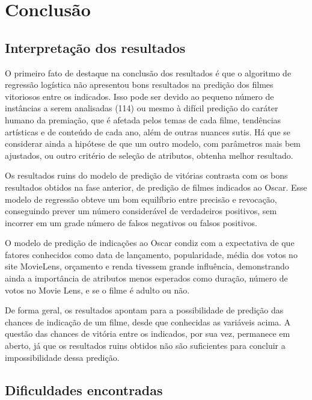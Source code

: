 \chapter[Conclusão]{Conclusão}
    \section{Interpretação dos resultados}\par
        O primeiro fato de destaque na conclusão dos resultados é que o algoritmo de regressão logística não apresentou bons resultados na predição dos filmes vitoriosos entre os indicados. Isso pode ser devido ao pequeno número de instâncias a serem analisadas (114) ou mesmo à difícil predição do caráter humano da premiação, que é afetada pelos temas de cada filme, tendências artísticas e de conteúdo de cada ano, além de outras nuances sutis. Há que se considerar ainda a hipótese de que um outro modelo, com parâmetros mais bem ajustados, ou outro critério de seleção de atributos, obtenha melhor resultado.
        
        Os resultados ruins do modelo de predição de vitórias contrasta com os bons resultados obtidos na fase anterior, de predição de filmes indicados ao Oscar. Esse modelo de regressão obteve um bom equilíbrio entre precisão e revocação, conseguindo prever um número considerável de verdadeiros positivos, sem incorrer em um grade número de falsos negativos ou falsos positivos.
        
        O modelo de predição de indicações ao Oscar condiz com a expectativa de que fatores conhecidos como data de lançamento, popularidade, média dos votos no site MovieLens, orçamento e renda tivessem grande influência, demonstrando ainda a importância de atributos menos esperados como duração, número de votos no Movie Lens, e se o filme é adulto ou não.
        
        De forma geral, os resultados apontam para a possibilidade de predição das chances de indicação de um filme, desde que conhecidas as variáveis acima. A questão das chances de vitória entre os indicados, por sua vez, permanece em aberto, já que os resultados ruins obtidos não são suficientes para concluir a impossibilidade dessa predição.

    \section[Dificuldades encontradas]{Dificuldades encontradas}

